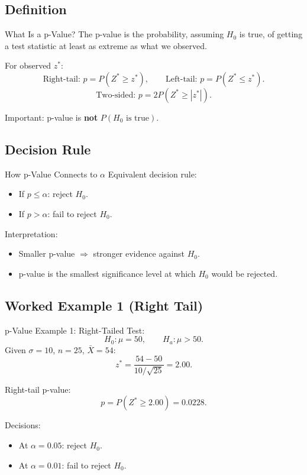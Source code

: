 \documentclass[aspectratio=169]{beamer}
\begin{document}
\subsection{Definition}
\begin{frame}{What Is a p-Value?}
  The p-value is the probability, assuming \(H_0\) is true, of getting a test statistic
  at least as extreme as what we observed.

  \vspace{2mm}
  For observed \(z^*\):
  \[
    \text{Right-tail: }p=P(Z^*\ge z^*),
    \qquad
    \text{Left-tail: }p=P(Z^*\le z^*).
  \]
  \[
    \text{Two-sided: }p=2P(Z^*\ge |z^*|).
  \]

  \vspace{1mm}
  Important: p-value is \textbf{not} \(P(H_0\text{ is true})\).
\end{frame}

\subsection{Decision Rule}
\begin{frame}{How p-Value Connects to \(\alpha\)}
  Equivalent decision rule:
  \begin{itemize}
    \item If \(p\le \alpha\): reject \(H_0\).
    \item If \(p>\alpha\): fail to reject \(H_0\).
  \end{itemize}

  \vspace{2mm}
  Interpretation:
  \begin{itemize}
    \item Smaller p-value \(\Rightarrow\) stronger evidence against \(H_0\).
    \item p-value is the smallest significance level at which \(H_0\) would be rejected.
  \end{itemize}
\end{frame}

\subsection{Worked Example 1 (Right Tail)}
\begin{frame}{p-Value Example 1: Right-Tailed}
  Test:
  \[
    H_0:\mu=50,\qquad H_a:\mu>50.
  \]
  Given \(\sigma=10\), \(n=25\), \(\bar X=54\):
  \[
    z^*=\frac{54-50}{10/\sqrt{25}}=2.00.
  \]

  Right-tail p-value:
  \[
    p=P(Z^*\ge 2.00)=0.0228.
  \]

  \vspace{1mm}
  Decisions:
  \begin{itemize}
    \item At \(\alpha=0.05\): reject \(H_0\).
    \item At \(\alpha=0.01\): fail to reject \(H_0\).
  \end{itemize}
\end{frame}
\end{document}
